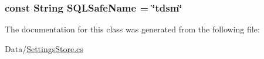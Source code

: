 \subsubsection[{S\+Q\+L\+Safe\+Name}]{\setlength{\rightskip}{0pt plus 5cm}const String S\+Q\+L\+Safe\+Name = \char`\"{}tdsm\char`\"{}}\label{classOTA_1_1Data_1_1SettingsStore_a5f7b801a55ee829062b5878a70c905b4}


The documentation for this class was generated from the following file\+:\begin{DoxyCompactItemize}
\item 
Data/\hyperlink{SettingsStore_8cs}{Settings\+Store.\+cs}\end{DoxyCompactItemize}
